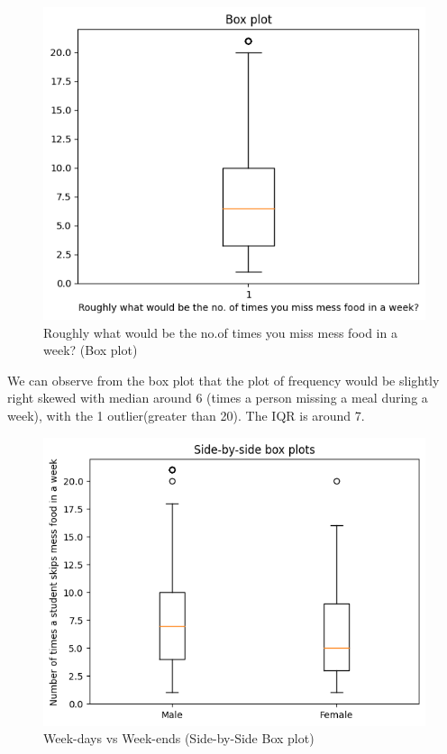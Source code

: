 \documentclass{article}
\begin{document}
\begin{figure}[H]
    \centering
    \includegraphics[scale = 1]{box_skipfrequency.png}
    \caption{Roughly what would be the no.of times you miss mess food in a week? (Box plot)}  
    \label{fig:boxplot}
\end{figure}
We can observe from the box plot that the plot of frequency would be slightly right skewed with median
around 6 (times a person missing a meal during a week), with the 1 outlier(greater than 20). The IQR is around
7.
\begin{figure}[H]
    \centering
    \includegraphics[scale = 0.9]{side-by-side-gender-skip-relation.png}
    \caption{Week-days vs Week-ends (Side-by-Side Box plot)}  
    \label{fig:side-by-side}
\end{figure}
\end{document}
